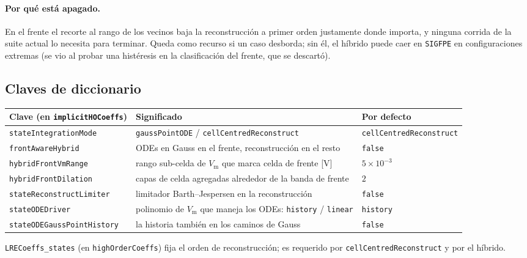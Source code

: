 \documentclass[11pt,a4paper]{article}
\newcommand{\code}[1]{\texttt{\small #1}}
\newcommand{\Vm}{V_{\text{m}}}
\begin{document}
\paragraph{Por qué está apagado.} En el frente el recorte al rango de los vecinos
baja la reconstrucción a primer orden justamente donde importa, y ninguna corrida
de la suite actual lo necesita para terminar. Queda como recurso si un caso
desborda; sin él, el híbrido puede caer en \code{SIGFPE} en configuraciones
extremas (se vio al probar una histéresis en la clasificación del frente, que se
descartó).

\subsection{Claves de diccionario}

\begin{center}
\begin{tabular}{@{}lll@{}}
\toprule
Clave (en \code{implicitHOCoeffs}) & Significado & Por defecto \\
\midrule
\code{stateIntegrationMode} & \code{gaussPointODE} / \code{cellCentredReconstruct} & \code{cellCentredReconstruct} \\
\code{frontAwareHybrid} & ODEs en Gauss en el frente, reconstrucción en el resto & \code{false} \\
\code{hybridFrontVmRange} & rango sub-celda de $\Vm$ que marca celda de frente [V] & $5\times10^{-3}$ \\
\code{hybridFrontDilation} & capas de celda agregadas alrededor de la banda de frente & $2$ \\
\code{stateReconstructLimiter} & limitador Barth--Jespersen en la reconstrucción & \code{false} \\
\code{stateODEDriver} & polinomio de $\Vm$ que maneja los ODEs: \code{history} / \code{linear} & \code{history} \\
\code{stateODEGaussPointHistory} & la historia también en los caminos de Gauss & \code{false} \\
\bottomrule
\end{tabular}
\end{center}
\code{LRECoeffs\_states} (en \code{highOrderCoeffs}) fija el orden de
reconstrucción; es requerido por \code{cellCentredReconstruct} y por el híbrido.

\end{document}
